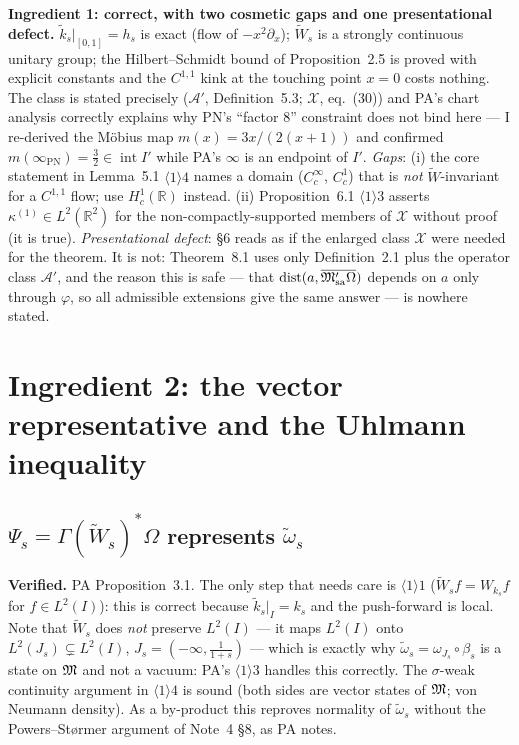 \documentclass[11pt]{article}
\newcommand{\Wt}{\widetilde W}
\newcommand{\kt}{\widetilde k}
\providecommand{\Om}{\Omega}\providecommand{\Gm}{\Gamma}\providecommand{\Qt}{\widetilde Q}
\providecommand{\dist}{\operatorname{dist}}\providecommand{\Var}{\operatorname{Var}}
\begin{document}
\begin{verdictgap}
\textbf{Ingredient 1: correct, with two cosmetic gaps and one presentational defect.}
$\kt_s|_{[0,1]}=h_s$ is exact (flow of $-x^2\partial_x$); $\Wt_s$ is a strongly continuous unitary
group; the Hilbert--Schmidt bound of Proposition~2.5 is proved with explicit constants and the
$C^{1,1}$ kink at the touching point $x=0$ costs nothing.  The class is stated precisely
($\mathcal A'$, Definition~5.3; $\mathcal X$, eq.~(30)) and PA's chart analysis correctly explains
why PN's ``factor $8$'' constraint does not bind here --- I re-derived the M\"obius map
$m(x)=3x/(2(x+1))$ and confirmed $m(\infty_{\mathrm{PN}})=\frac32\in\operatorname{int}I'$ while PA's
$\infty$ is an endpoint of $I'$.  \emph{Gaps}: (i) the core statement in Lemma~5.1
$\langle1\rangle4$ names a domain ($C_c^\infty$, $C_c^1$) that is \emph{not} $\Wt$-invariant for a
$C^{1,1}$ flow; use $H^1_c(\mathbb R)$ instead.  (ii) Proposition~6.1 $\langle1\rangle3$ asserts
$\kappa^{(1)}\in L^2(\mathbb R^2)$ for the non-compactly-supported members of $\mathcal X$ without
proof (it is true).  \emph{Presentational defect}: \S6 reads as if the enlarged class $\mathcal X$
were needed for the theorem.  It is not: Theorem~8.1 uses only Definition~2.1 plus the operator
class $\mathcal A'$, and the reason this is safe --- that $\dist(a,\overline{\Mpsa\Om})$ depends on
$a$ only through $\varphi$, so all admissible extensions give the same answer --- is nowhere stated.
\end{verdictgap}

\section{Ingredient 2: the vector representative and the Uhlmann inequality}\label{sec:i2}

\subsection{$\Psi_s=\Gm(\Wt_s)^*\Om$ represents $\widetilde\omega_s$}
\textbf{Verified.}  PA Proposition~3.1.  The only step that needs care is $\langle1\rangle1$
($\Wt_sf=W_{k_s}f$ for $f\in L^2(I)$): this is correct because $\kt_s|_I=k_s$ and the push-forward
is local.  Note that $\Wt_s$ does \emph{not} preserve $L^2(I)$ --- it maps $L^2(I)$ onto
$L^2(J_s)\subsetneq L^2(I)$, $J_s=(-\infty,\frac1{1+s})$ --- which is exactly why
$\widetilde\omega_s=\omega_{J_s}\circ\beta_s$ is a state on $\mathfrak M$ and not a vacuum: PA's
$\langle1\rangle3$ handles this correctly.  The $\sigma$-weak continuity argument in
$\langle1\rangle4$ is sound (both sides are vector states of $\mathfrak M$; von Neumann density).
As a by-product this reproves normality of $\widetilde\omega_s$ without the Powers--St\o rmer
argument of Note~4 \S8, as PA notes.
\end{document}
